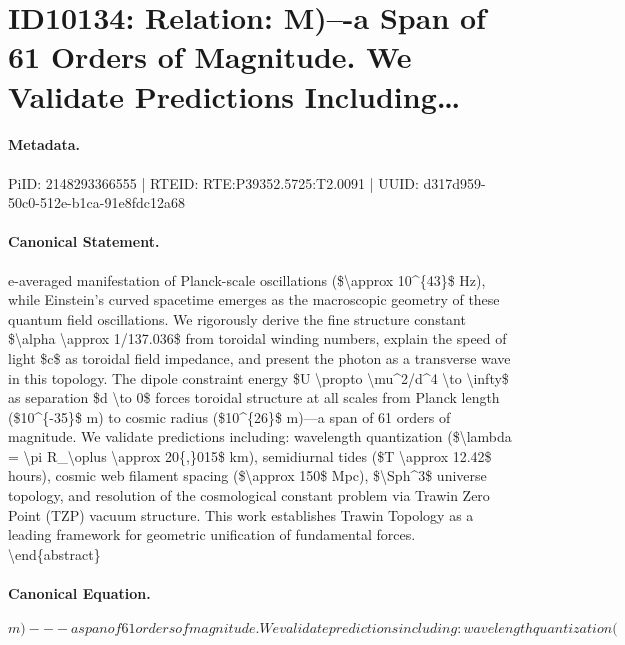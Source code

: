 \section*{ID10134: Relation: M)–-a Span of 61 Orders of Magnitude. We Validate Predictions Including…}
\paragraph{Metadata.}
PiID: 2148293366555 | RTEID: RTE:P39352.5725:T2.0091 | UUID: d317d959-50c0-512e-b1ca-91e8fdc12a68

\paragraph{Canonical Statement.}
e-averaged manifestation of Planck-scale oscillations (\$\textbackslash{}approx 10\textasciicircum{}\{43\}\$ Hz), while Einstein's curved spacetime emerges as the macroscopic geometry of these quantum field oscillations. We rigorously derive the fine structure constant \$\textbackslash{}alpha \textbackslash{}approx 1/137.036\$ from toroidal winding numbers, explain the speed of light \$c\$ as toroidal field impedance, and present the photon as a transverse wave in this topology. The dipole constraint energy \$U \textbackslash{}propto \textbackslash{}mu\textasciicircum{}2/d\textasciicircum{}4 \textbackslash{}to \textbackslash{}infty\$ as separation \$d \textbackslash{}to 0\$ forces toroidal structure at all scales from Planck length (\$10\textasciicircum{}\{-35\}\$ m) to cosmic radius (\$10\textasciicircum{}\{26\}\$ m)---a span of 61 orders of magnitude. We validate predictions including: wavelength quantization (\$\textbackslash{}lambda = \textbackslash{}pi R\_\textbackslash{}oplus \textbackslash{}approx 20\{,\}015\$ km), semidiurnal tides (\$T \textbackslash{}approx 12.42\$ hours), cosmic web filament spacing (\$\textbackslash{}approx 150\$ Mpc), \$\textbackslash{}Sph\textasciicircum{}3\$ universe topology, and resolution of the cosmological constant problem via Trawin Zero Point (TZP) vacuum structure. This work establishes Trawin Topology as a leading framework for geometric unification of fundamental forces. \textbackslash{}end\{abstract\}

\paragraph{Canonical Equation.}
\[
m)---a span of 61 orders of magnitude. We validate predictions including: wavelength quantization (
\]

